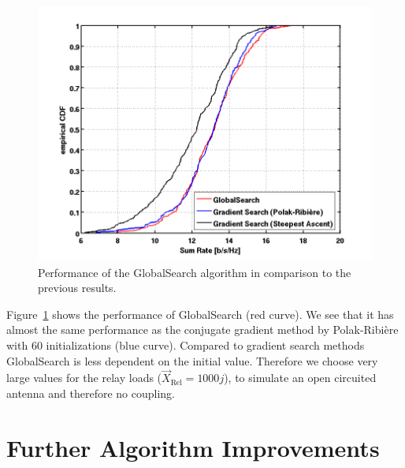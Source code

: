 \begin{figure}[h]
\centering
  \includegraphics[width=0.9\linewidth]{images/Globalscomparison_edited.png}
\caption{Performance of the GlobalSearch algorithm in comparison to the previous results.}
\label{fig:globals}
\end{figure}
Figure~\ref{fig:globals} shows the performance of GlobalSearch (red curve).
We see that it has almost the same performance as the conjugate gradient method by Polak-Ribi\`{e}re with 60 initializations (blue curve).
Compared to gradient search methods GlobalSearch is less dependent on the initial value.
Therefore we choose very large values for the relay loads ($\vec{X}_{\text{Rel}} = 1000j$), to simulate an open circuited antenna and therefore no coupling.


\section{Further Algorithm Improvements}

